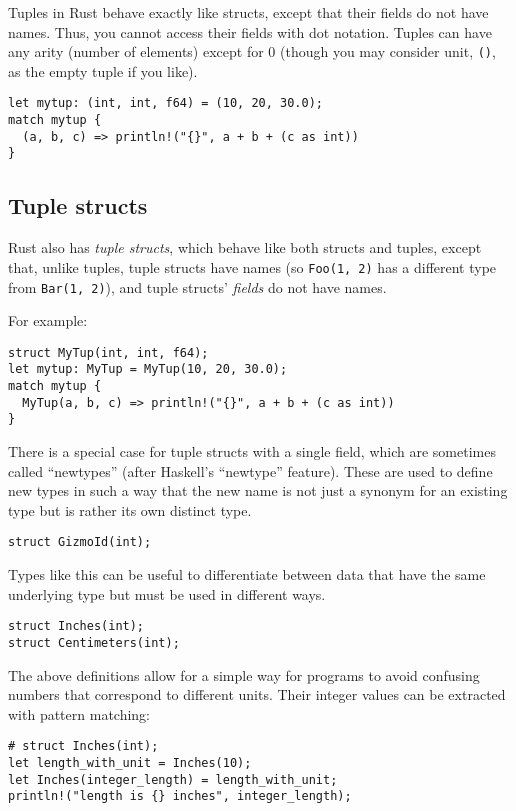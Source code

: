 \documentclass[]{article}
\begin{document}
Tuples in Rust behave exactly like structs, except that their fields do
not have names. Thus, you cannot access their fields with dot notation.
Tuples can have any arity (number of elements) except for 0 (though you
may consider unit, \texttt{()}, as the empty tuple if you like).

\begin{verbatim}
let mytup: (int, int, f64) = (10, 20, 30.0);
match mytup {
  (a, b, c) => println!("{}", a + b + (c as int))
}
\end{verbatim}

\subsection{Tuple structs}\label{tuple-structs}

Rust also has \emph{tuple structs}, which behave like both structs and
tuples, except that, unlike tuples, tuple structs have names (so
\texttt{Foo(1, 2)} has a different type from \texttt{Bar(1, 2)}), and
tuple structs' \emph{fields} do not have names.

For example:

\begin{verbatim}
struct MyTup(int, int, f64);
let mytup: MyTup = MyTup(10, 20, 30.0);
match mytup {
  MyTup(a, b, c) => println!("{}", a + b + (c as int))
}
\end{verbatim}

There is a special case for tuple structs with a single field, which are
sometimes called ``newtypes'' (after Haskell's ``newtype'' feature).
These are used to define new types in such a way that the new name is
not just a synonym for an existing type but is rather its own distinct
type.

\begin{verbatim}
struct GizmoId(int);
\end{verbatim}

Types like this can be useful to differentiate between data that have
the same underlying type but must be used in different ways.

\begin{verbatim}
struct Inches(int);
struct Centimeters(int);
\end{verbatim}

The above definitions allow for a simple way for programs to avoid
confusing numbers that correspond to different units. Their integer
values can be extracted with pattern matching:

\begin{verbatim}
# struct Inches(int);
let length_with_unit = Inches(10);
let Inches(integer_length) = length_with_unit;
println!("length is {} inches", integer_length);
\end{verbatim}
\end{document}
